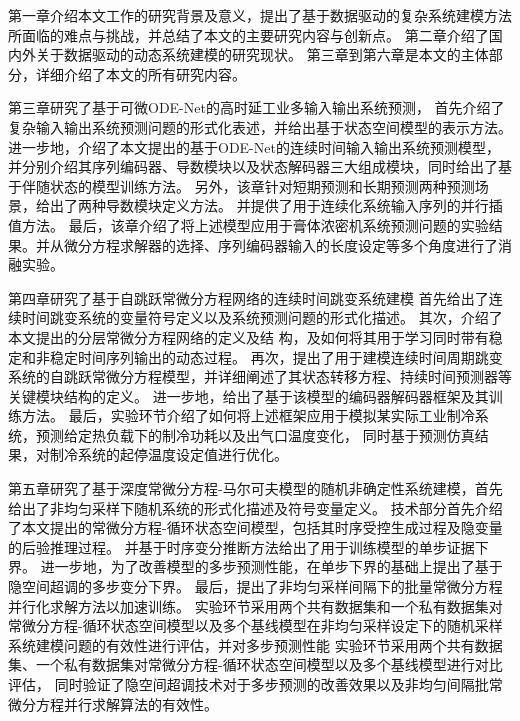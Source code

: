 第一章介绍本文工作的研究背景及意义，提出了基于数据驱动的复杂系统建模方法所面临的难点与挑战，并总结了本文的主要研究内容与创新点。
第二章介绍了国内外关于数据驱动的动态系统建模的研究现状。
第三章到第六章是本文的主体部分，详细介绍了本文的所有研究内容。


第三章研究了基于可微ODE-Net的高时延工业多输入输出系统预测，
首先介绍了复杂输入输出系统预测问题的形式化表述，并给出基于状态空间模型的表示方法。
进一步地，介绍了本文提出的基于ODE-Net的连续时间输入输出系统预测模型，并分别介绍其序列编码器、导数模块以及状态解码器三大组成模块，同时给出了基于伴随状态的模型训练方法。
另外，该章针对短期预测和长期预测两种预测场景，给出了两种导数模块定义方法。
并提供了用于连续化系统输入序列的并行插值方法。
最后，该章介绍了将上述模型应用于膏体浓密机系统预测问题的实验结果。并从微分方程求解器的选择、序列编码器输入的长度设定等多个角度进行了消融实验。

第四章研究了基于自跳跃常微分方程网络的连续时间跳变系统建模
首先给出了连续时间跳变系统的变量符号定义以及系统预测问题的形式化描述。
其次，介绍了本文提出的分层常微分方程网络的定义及结
构，及如何将其用于学习同时带有稳定和非稳定时间序列输出的动态过程。
再次，提出了用于建模连续时间周期跳变系统的自跳跃常微分方程模型，并详细阐述了其状态转移方程、持续时间预测器等关键模块结构的定义。
进一步地，给出了基于该模型的编码器解码器框架及其训练方法。
最后，实验环节介绍了如何将上述框架应用于模拟某实际工业制冷系统，预测给定热负载下的制冷功耗以及出气口温度变化，
同时基于预测仿真结果，对制冷系统的起停温度设定值进行优化。

第五章研究了基于深度常微分方程-马尔可夫模型的随机非确定性系统建模，首先给出了非均匀采样下随机系统的形式化描述及符号变量定义。
技术部分首先介绍了本文提出的常微分方程-循环状态空间模型，包括其时序受控生成过程及隐变量的后验推理过程。
并基于时序变分推断方法给出了用于训练模型的单步证据下界。
进一步地，为了改善模型的多步预测性能，在单步下界的基础上提出了基于隐空间超调的多步变分下界。
最后，提出了非均匀采样间隔下的批量常微分方程并行化求解方法以加速训练。
实验环节采用两个共有数据集和一个私有数据集对常微分方程-循环状态空间模型以及多个基线模型在非均匀采样设定下的随机采样系统建模问题的有效性进行评估，并对多步预测性能
实验环节采用两个共有数据集、一个私有数据集对常微分方程-循环状态空间模型以及多个基线模型进行对比评估，
同时验证了隐空间超调技术对于多步预测的改善效果以及非均匀间隔批常微分方程并行求解算法的有效性。

